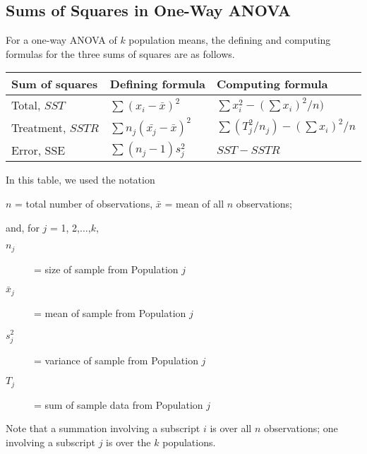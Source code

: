 \documentclass[12pt]{article}
\newcommand\T{\rule{0pt}{2.6ex}}       %
\newcommand\B{\rule[-1.2ex]{0pt}{0pt}} %
\begin{document}
        \subsection*{Sums of Squares in One-Way ANOVA}
            For a one-way ANOVA of $k$ population means, the defining and computing
            formulas for the three sums of squares are as follows.
\begin{table}[h!]
    \centering
    \begin{tabular}{l|l|l}
        Sum of squares&   Defining formula        &   Computing formula \B \\
        \hline
        Total, $SST$  &   $\sum(x_i-\bar{x})^2$   &   $\sum x_i^2 - (\sum x_i)^2/n)$ \T\B \\
        Treatment, $SSTR$ &   $\sum n_j(\bar{x_j}-\bar{x})^2$ &   $\sum(T_j^2/n_j)-(\sum x_i)^2/n$ \T\B \\
        Error, SSE    &   $\sum(n_j-1)s_j^2$  &   $SST-SSTR$ \T \\
    \end{tabular}
\end{table}
            In this table, we used the notation
            \begin{center}
                $n$ = total number of observations,         \newline
                $\bar{x}$ = mean of all $n$ observations;   \newline
            \end{center}
            and, for $j$ = 1, 2,$\dots$,$k$,
            \begin{center}
                \begin{description}
                    \item[$n_j$] = size of sample from Population $j$          
                    \item[$\bar{x}_j$] = mean of sample from Population $j$    
                    \item[$s_j^2$] = variance of sample from Population $j$    
                    \item[$T_j$] = sum of sample data from Population  $j$     
                \end{description}
            \end{center}
            Note that a summation involving a subscript $i$ is over all $n$ observations;
            one involving a subscript $j$ is over the $k$ populations.
\end{document}
